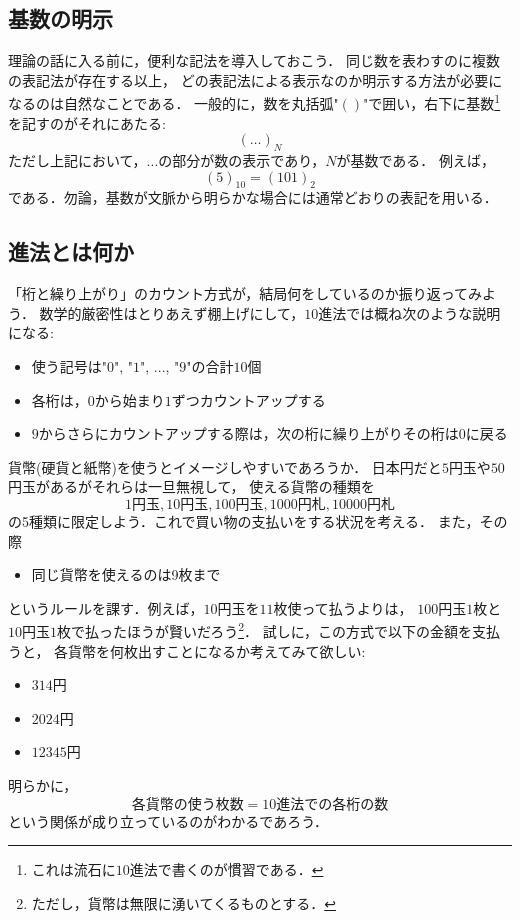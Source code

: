 \documentclass[a5j, uplatex, dvipdfmx]{jsbook}
\begin{document}
\subsection{基数の明示}
    理論の話に入る前に，便利な記法を導入しておこう．
    同じ数を表わすのに複数の表記法が存在する以上，
    どの表記法による表示なのか明示する方法が必要になるのは自然なことである．
    一般的に，数を丸括弧"$()$"で囲い，右下に基数\footnote{
        これは流石に$10$進法で書くのが慣習である．
    }
    を記すのがそれにあたる:
    \begin{equation*}
        (\dots)_N
    \end{equation*}
    ただし上記において，$...$の部分が数の表示であり，$N$が基数である．
    例えば，
    \begin{equation*}
        (5)_{10} = (101)_2
    \end{equation*}
    である．勿論，基数が文脈から明らかな場合には通常どおりの表記を用いる．

\subsection{進法とは何か}
    「桁と繰り上がり」のカウント方式が，結局何をしているのか振り返ってみよう．
    数学的厳密性はとりあえず棚上げにして，$10$進法では概ね次のような説明になる:

    \begin{itemize}
        \item 使う記号は"$0$", "$1$", ..., "$9$"の合計$10$個
        \item 各桁は，$0$から始まり$1$ずつカウントアップする
        \item $9$からさらにカウントアップする際は，次の桁に繰り上がりその桁は$0$に戻る
    \end{itemize}

    貨幣(硬貨と紙幣)を使うとイメージしやすいであろうか．
    日本円だと$5$円玉や$50$円玉があるがそれらは一旦無視して，
    使える貨幣の種類を
    \begin{equation*}
        1円玉, 10円玉, 100円玉, 1000円札, 10000円札
    \end{equation*}
    の5種類に限定しよう．これで買い物の支払いをする状況を考える．
    また，その際
    \begin{itemize}
        \item 同じ貨幣を使えるのは9枚まで
    \end{itemize}
    というルールを課す．例えば，$10$円玉を$11$枚使って払うよりは，
    $100$円玉$1$枚と$10$円玉$1$枚で払ったほうが賢いだろう\footnote{
        ただし，貨幣は無限に湧いてくるものとする．
    }．
    試しに，この方式で以下の金額を支払うと，
    各貨幣を何枚出すことになるか考えてみて欲しい:
    \begin{itemize}
        \item $314$円
        \item $2024$円
        \item $12345$円
    \end{itemize}
    明らかに，
    \begin{equation*}
        各貨幣の使う枚数 = 10進法での各桁の数
    \end{equation*}
    という関係が成り立っているのがわかるであろう．
\end{document}
